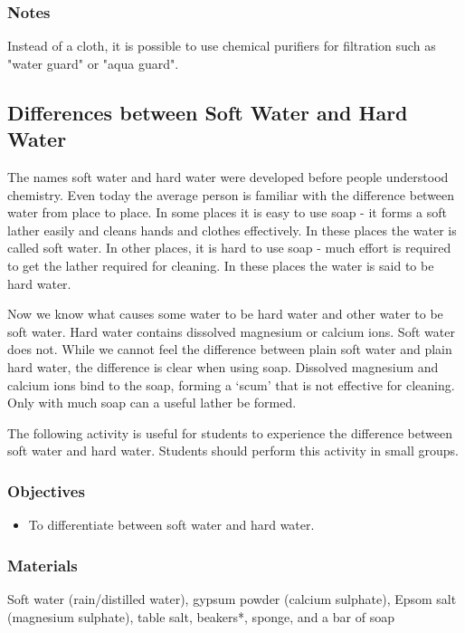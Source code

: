 \subsubsection*{Notes}
Instead of a cloth, it is possible to use chemical purifiers for filtration such as "water guard" or "aqua guard".

\subsection{Differences between Soft Water and Hard Water}

The names soft water and hard water were developed before people understood chemistry. Even today the average person is familiar with the difference between water from place to place. In some places it is easy to use soap - it forms a soft lather easily and cleans hands and clothes effectively. In these places the water is called soft water. In other places, it is hard to use soap - much effort is required to get the lather required for cleaning. In these places the water is said to be hard water.

Now we know what causes some water to be hard water and other water to be soft water. Hard water contains dissolved magnesium or calcium ions. Soft water does not. While we cannot feel the difference between plain soft water and plain hard water, the difference is clear when using soap. Dissolved magnesium and calcium ions bind to the soap, forming a `scum' that is not effective for cleaning. Only with much soap can a useful lather be formed.

The following activity is useful for students to experience the difference between soft water and hard water. Students should perform this activity in small groups.

\subsubsection*{Objectives}
\begin{itemize}
\item{To differentiate between soft water and hard water.}
\end{itemize}

\subsubsection*{Materials}
Soft water (rain/distilled water), gypsum powder (calcium sulphate), Epsom salt (magnesium sulphate), table salt, beakers*, sponge, and a bar of soap


